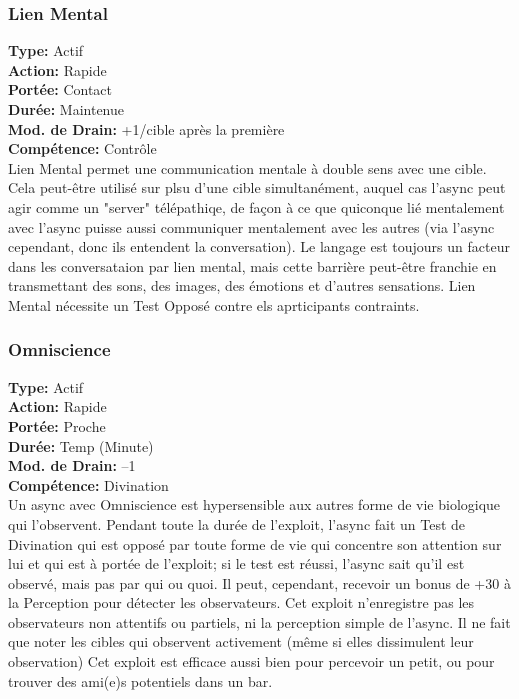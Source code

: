\subsubsection{Lien Mental} \textbf{Type:} Actif \\ \textbf{Action:} Rapide \\ \textbf{Portée:} Contact \\ \textbf{Durée:} Maintenue \\ \textbf{Mod. de Drain:} +1/cible après la première \\ \textbf{Compétence:} Contrôle \\ Lien Mental permet une communication mentale à double sens avec une cible. Cela peut-être utilisé sur plsu d'une cible simultanément, auquel cas l'async peut agir comme un "server" télépathiqe, de façon à ce que quiconque lié mentalement avec l'async puisse aussi communiquer mentalement avec les autres (via l'async cependant, donc ils entendent la conversation). Le langage est toujours un facteur dans les conversataion par lien mental, mais cette barrière peut-être franchie en transmettant des sons, des images, des émotions et d'autres sensations. Lien Mental nécessite un Test Opposé contre els aprticipants contraints. 

\subsubsection{Omniscience} \textbf{Type:} Actif \\ \textbf{Action:} Rapide \\ \textbf{Portée:} Proche \\ \textbf{Durée:} Temp (Minute) \\ \textbf{Mod. de Drain:} –1 \\ \textbf{Compétence:} Divination \\ Un async avec Omniscience est hypersensible aux autres forme de vie biologique qui l'observent. Pendant toute la durée de l'exploit, l'async fait un Test de Divination qui est opposé par toute forme de vie qui concentre son attention sur lui et qui est à portée de l'exploit; si le test est réussi, l'async sait qu'il est observé, mais pas par qui ou quoi. Il peut, cependant, recevoir un bonus de +30 à la Perception pour détecter les observateurs. Cet exploit n'enregistre pas les observateurs non attentifs ou partiels, ni la perception simple de l'async. Il ne fait que noter les cibles qui observent activement (même si elles dissimulent leur observation) Cet exploit est efficace aussi bien pour percevoir un petit, ou pour trouver des ami(e)s potentiels dans un bar. 

